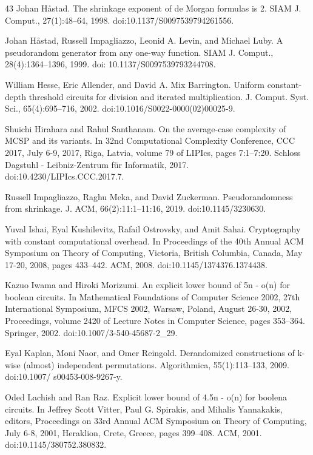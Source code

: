 \documentclass[10pt,a4paper]{article}
\begin{document}
\begin{thebibliography}{43}
Johan Håstad. The shrinkage exponent of de Morgan formulas is 2. SIAM J. Comput., 27(1):48–64, 1998. doi:10.1137/S0097539794261556.

Johan Håstad, Russell Impagliazzo, Leonid A. Levin, and Michael Luby. A pseudorandom generator from any one-way function. SIAM J. Comput., 28(4):1364–1396, 1999. doi: 10.1137/S0097539793244708.

William Hesse, Eric Allender, and David A. Mix Barrington. Uniform constant-depth threshold circuits for division and iterated multiplication. J. Comput. Syst. Sci., 65(4):695–716, 2002. doi:10.1016/S0022-0000(02)00025-9.

Shuichi Hirahara and Rahul Santhanam. On the average-case complexity of MCSP and its variants. In 32nd Computational Complexity Conference, CCC 2017, July 6-9, 2017, Riga, Latvia, volume 79 of LIPIcs, pages 7:1–7:20. Schloss Dagstuhl - Leibniz-Zentrum für Informatik, 2017. doi:10.4230/LIPIcs.CCC.2017.7.

Russell Impagliazzo, Raghu Meka, and David Zuckerman. Pseudorandomness from shrinkage. J. ACM, 66(2):11:1–11:16, 2019. doi:10.1145/3230630.

Yuval Ishai, Eyal Kushilevitz, Rafail Ostrovsky, and Amit Sahai. Cryptography with constant computational overhead. In Proceedings of the 40th Annual ACM Symposium on Theory of Computing, Victoria, British Columbia, Canada, May 17-20, 2008, pages 433–442. ACM, 2008. doi:10.1145/1374376.1374438.

Kazuo Iwama and Hiroki Morizumi. An explicit lower bound of 5n - o(n) for boolean circuits. In Mathematical Foundations of Computer Science 2002, 27th International Symposium, MFCS 2002, Warsaw, Poland, August 26-30, 2002, Proceedings, volume 2420 of Lecture Notes in Computer Science, pages 353–364. Springer, 2002. doi:10.1007/3-540-45687-2\_29.

Eyal Kaplan, Moni Naor, and Omer Reingold. Derandomized constructions of k-wise (almost) independent permutations. Algorithmica, 55(1):113–133, 2009. doi:10.1007/ s00453-008-9267-y.

Oded Lachish and Ran Raz. Explicit lower bound of 4.5n - o(n) for boolena circuits. In Jeffrey Scott Vitter, Paul G. Spirakis, and Mihalis Yannakakis, editors, Proceedings on 33rd Annual ACM Symposium on Theory of Computing, July 6-8, 2001, Heraklion, Crete, Greece, pages 399–408. ACM, 2001. doi:10.1145/380752.380832.


\end{thebibliography}
\end{document}
